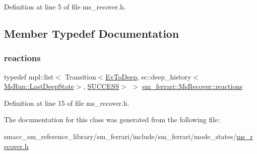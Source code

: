 Definition at line 5 of file ms\+\_\+recover.\+h.



\subsection{Member Typedef Documentation}
\mbox{\label{classsm__ferrari_1_1MsRecover_ae1fd3367d4671139a433e24c71f8b9b3}} 
\subsubsection{\texorpdfstring{reactions}{reactions}}
{\footnotesize\ttfamily typedef mpl\+::list$<$ Transition$<$\hyperlink{structsm__ferrari_1_1EvToDeep}{Ev\+To\+Deep}, sc\+::deep\+\_\+history$<$\hyperlink{classsmacc_1_1SmaccState_a60088405d2d99d468caa0baa3b2830a8}{Ms\+Run\+::\+Last\+Deep\+State}$>$, \hyperlink{classSUCCESS}{S\+U\+C\+C\+E\+SS}$>$ $>$ \hyperlink{classsm__ferrari_1_1MsRecover_ae1fd3367d4671139a433e24c71f8b9b3}{sm\+\_\+ferrari\+::\+Ms\+Recover\+::reactions}}



Definition at line 15 of file ms\+\_\+recover.\+h.



The documentation for this class was generated from the following file\+:\begin{DoxyCompactItemize}
\item 
smacc\+\_\+sm\+\_\+reference\+\_\+library/sm\+\_\+ferrari/include/sm\+\_\+ferrari/mode\+\_\+states/\hyperlink{sm__ferrari_2include_2sm__ferrari_2mode__states_2ms__recover_8h}{ms\+\_\+recover.\+h}\end{DoxyCompactItemize}

